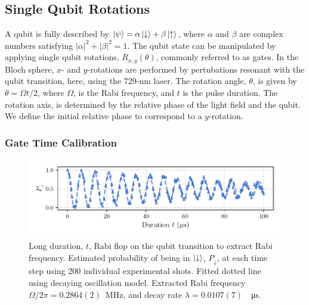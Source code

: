 \subsection{Single Qubit Rotations}
\label{sec:Single Qubit Gates}
    A qubit is fully described by $\ket{\psi} = \alpha\ket{\downarrow} + \beta\ket{\uparrow}$, where $\alpha$ and $\beta$ are complex numbers satisfying $|\alpha|^2 + |\beta|^2 = 1$. The qubit state can be manipulated by applying single qubit rotations, $R_{x,y}(\theta)$, commonly referred to as gates. In the Bloch sphere, $x$- and $y$-rotations are performed by pertubations resonant with the qubit transition, here, using the 729-nm laser. The rotation angle, $\theta$, is given by $\theta=\Omega t/2$, where $\Omega$, is the Rabi frequency, and $t$ is the pulse duration. The rotation axis, is determined by the relative phase of the light field and the qubit. We define the initial relative phase to correspond to a $y$-rotation.

\subsubsection{Gate Time Calibration}

    \begin{figure}
        \begin{center}
        \noindent\includegraphics[width=\linewidth]{
            figures/pdf_figure/long_flop.pdf
            }
        \end{center}
        \caption{Long duration, $t$, Rabi flop on the qubit transition to extract Rabi frequency. Estimated probability of being in $\ket{\downarrow}$, $P_\downarrow$, at each time step using 200 individual experimental shots. Fitted dotted line using decaying oscillation model. Extracted Rabi frequency $\Omega/2\pi = 0.2864(2)$~\unit{\MHz}, and decay rate $\lambda = 0.0107(7)$~\unit{\per\us}. 
            }
        \label{fig:Long Flop}
    \end{figure}

